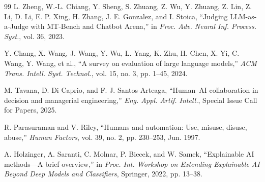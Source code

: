 \documentclass[a4paper,fleqn]{cas-dc}
\begin{document}
\begin{thebibliography}{99}
L. Zheng, W.-L. Chiang, Y. Sheng, S. Zhuang, Z. Wu, Y. Zhuang, Z. Lin, Z. Li, D. Li, E. P. Xing, H. Zhang, J. E. Gonzalez, and I. Stoica, ``Judging LLM-as-a-Judge with MT-Bench and Chatbot Arena,'' in \emph{Proc. Adv. Neural Inf. Process. Syst.}, vol. 36, 2023.

Y. Chang, X. Wang, J. Wang, Y. Wu, L. Yang, K. Zhu, H. Chen, X. Yi, C. Wang, Y. Wang, et al., ``A survey on evaluation of large language models,'' \emph{ACM Trans. Intell. Syst. Technol.}, vol. 15, no. 3, pp. 1--45, 2024.

M. Tavana, D. Di Caprio, and F. J. Santos-Arteaga, ``Human--AI collaboration in decision and managerial engineering,'' \emph{Eng. Appl. Artif. Intell.}, Special Issue Call for Papers, 2025.

R. Parasuraman and V. Riley, ``Humans and automation: Use, misuse, disuse, abuse,'' \emph{Human Factors}, vol. 39, no. 2, pp. 230--253, Jun. 1997.

A. Holzinger, A. Saranti, C. Molnar, P. Biecek, and W. Samek, ``Explainable AI methods---A brief overview,'' in \emph{Proc. Int. Workshop on Extending Explainable AI Beyond Deep Models and Classifiers}, Springer, 2022, pp. 13--38.

\end{thebibliography}
\end{document}
